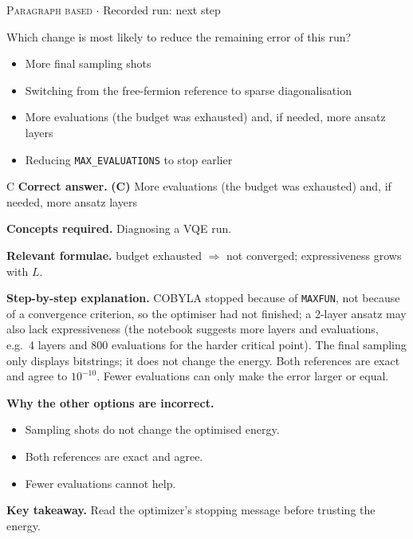 \documentclass[11pt,a4paper]{article}
\newcommand{\optlabel}[1]{\textbf{(#1)}}
\newcommand{\correctlabel}[1]{\textcolor{okgreen}{\textbf{(#1)}\,\ding{51}}}
\newenvironment{qitem}[1]{\begin{list}{}{\setlength{\leftmargin}{3.3em}\setlength{\labelwidth}{3.1em}%
  \setlength{\labelsep}{0.2em}\setlength{\topsep}{3pt}\setlength{\parsep}{3pt}}\item[\textbf{Q.#1}\hfill]}{\end{list}}
\newcommand{\qsep}{\par\vspace{2pt}{\color{black!15}\hrule}\vspace{4pt}}
\newcommand{\qmeta}[2]{{\footnotesize\color{black!60}\textsc{#1} \;$\cdot$\; #2}\par}
\begin{document}
\begin{qitem}{80}
\qmeta{Paragraph based}{Recorded run: next step}
Which change is most likely to reduce the remaining error of this run?
\begin{itemize}[leftmargin=2.6em, labelsep=0.4em, itemsep=2pt, topsep=3pt]
\item[\optlabel{A}] More final sampling shots
\item[\optlabel{B}] Switching from the free-fermion reference to sparse diagonalisation
\item[\correctlabel{C}] More evaluations (the budget was exhausted) and, if needed, more ansatz layers
\item[\optlabel{D}] Reducing \texttt{MAX\_EVALUATIONS} to stop earlier
\end{itemize}
\end{qitem}
\begin{solbox}{C}
\textbf{\color{brand}Correct answer.} \textcolor{okgreen}{\textbf{(C)}} More evaluations (the budget was exhausted) and, if needed, more ansatz layers

\textbf{\color{brand}Concepts required.} Diagnosing a VQE run.

\textbf{\color{brand}Relevant formulae.} budget exhausted $\Rightarrow$ not converged; expressiveness grows with $L$.

\textbf{\color{brand}Step-by-step explanation.} COBYLA stopped because of \texttt{MAXFUN}, not because of a convergence criterion, so the optimiser had not finished; a 2-layer ansatz may also lack
expressiveness (the notebook suggests more layers and evaluations, e.g.\ 4 layers and 800 evaluations for the harder critical point). The final
sampling only displays bitstrings; it does not change the energy. Both references are exact and agree to $10^{-10}$. Fewer evaluations can only
make the error larger or equal.

\textbf{\color{brand}Why the other options are incorrect.}
\begin{itemize}[leftmargin=2.4em, itemsep=1pt, topsep=2pt]
\item[\textbf{(A)}] Sampling shots do not change the optimised energy.
\item[\textbf{(B)}] Both references are exact and agree.
\item[\textbf{(D)}] Fewer evaluations cannot help.
\end{itemize}
\textbf{\color{brand}Key takeaway.} Read the optimizer's stopping message before trusting the energy.
\end{solbox}
\qsep
\end{document}
